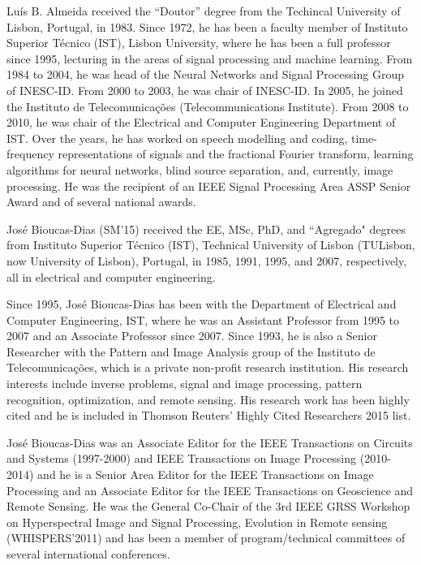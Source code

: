 \documentclass[10pt,twocolumn,twoside]{IEEEtran}
\begin{document}
\begin{IEEEbiography}{Lu\'is B. Almeida} 
	received the “Doutor” degree from the Techincal University of Lisbon, Portugal, in 1983. Since 1972, he has been a faculty member of Instituto Superior T\'{e}cnico (IST), Lisbon University, where he has been a full professor since 1995, lecturing in the areas of signal processing and machine learning. From 1984 to 2004, he was head of the Neural Networks and Signal Processing Group of INESC-ID. From 2000 to 2003, he was chair of INESC-ID. In 2005, he joined the Instituto de Telecomunica\c{c}\~{o}es (Telecommunications Institute). From 2008 to 2010, he was chair of the Electrical and Computer Engineering Department of IST. Over the years, he has worked on speech modelling and coding, time-frequency representations of signals and the fractional Fourier transform, learning algorithms for neural networks, blind source separation, and, currently, image processing. He was the recipient of an IEEE Signal Processing Area ASSP Senior Award and of several national awards.
\end{IEEEbiography}

\begin{IEEEbiography}{Jos\'e Bioucas-Dias}
	(SM'15) received the EE, MSc, PhD, and ``Agregado" degrees from Instituto Superior T\'ecnico (IST), Technical University of Lisbon (TULisbon, now University of Lisbon), Portugal, in 1985, 1991, 1995, and 2007, respectively, all in electrical and computer engineering.
	
	Since 1995, Jos\'e Bioucas-Dias has been with the Department of Electrical and Computer Engineering, IST, where he was an Assistant Professor from 1995 to 2007 and an Associate Professor since 2007. Since 1993, he is also a Senior Researcher with the Pattern and Image Analysis group of the Instituto de Telecomunica\c{c}\~oes, which is a private  non-profit research institution. His  research interests include inverse problems, signal and image processing, pattern recognition, optimization, and remote sensing. His research work has been highly cited and he is included in Thomson Reuters' Highly Cited Researchers 2015 list. 
	
	Jos\'e Bioucas-Dias was an Associate Editor for the {\sc IEEE Transactions on Circuits and Systems} (1997-2000) and  {\sc IEEE Transactions on Image Processing} (2010-2014) and he is  a Senior Area  Editor for the {\sc IEEE Transactions on Image Processing} and an Associate Editor for the {\sc IEEE Transactions on Geoscience and Remote Sensing}.  He was the General Co-Chair of the 3rd IEEE GRSS Workshop on Hyperspectral Image and Signal Processing, Evolution in Remote sensing (WHISPERS'2011) and has been a member of program/technical committees of several international conferences. 
\end{IEEEbiography}
\end{document}
